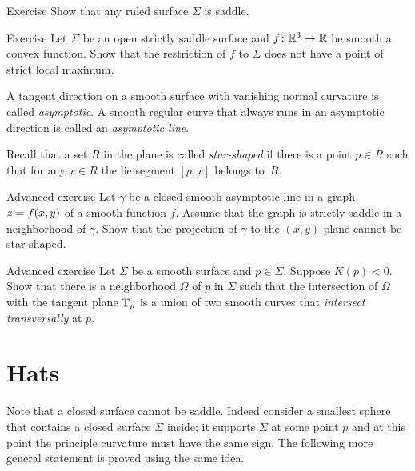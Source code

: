 \begin{thm}{Exercise}\label{ex:ruled=>saddle}
Show that any ruled surface $\Sigma$ is saddle.
\end{thm}

\begin{thm}{Exercise}\label{ex:saddle-convex}
Let $\Sigma$ be an open strictly saddle surface and $f\:\RR^3\z\to\RR$ be smooth a convex function.
Show that the restriction of $f$ to $\Sigma$ does not have a point of strict local maximum.
\end{thm}

A tangent direction on a smooth surface with vanishing normal curvature is called \emph{asymptotic}.
A smooth regular curve that always runs in an asymptotic direction is called an
\emph{asymptotic line}.\label{page:asymptotic line}

Recall that a set $R$ in the plane is called \emph{star-shaped} if there is a point $p\in R$ such that for any $x\in R$ the lie segment $[p,x]$ belongs to~$R$.

\begin{thm}{Advanced exercise}\label{ex:panov}
Let $\gamma$ be a closed smooth asymptotic line
in a graph $z\z=f(x,y)$ of a smooth function $f$. 
Assume that the graph is strictly saddle in a neighborhood of $\gamma$.
Show that the projection of $\gamma$ to the $(x,y)$-plane cannot be star-shaped. 
\end{thm}

\begin{thm}{Advanced exercise}\label{ex:crosss}
Let $\Sigma$ be a smooth surface and $p\in \Sigma$.
Suppose $K(p)<0$.
Show that there is a neighborhood $\Omega$ of $p$ in $\Sigma$
such that the intersection of $\Omega$ with the tangent plane $\mathrm{T}_p$ is a union of two smooth curves that  \emph{intersect transversally} at $p$.
\end{thm}


\section{Hats}

Note that a closed surface cannot be saddle.
Indeed consider a smallest sphere that contains a closed surface $\Sigma$ inside;
it supports $\Sigma$ at some point $p$ and at this point the principle curvature must have the same sign.
The following more general statement  is proved using the same idea.


